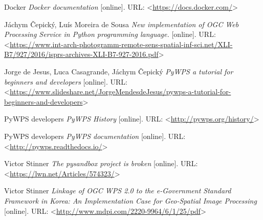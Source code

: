 \documentclass[12pt,a4paper]{article}
\begin{document}
\begin{thebibliography}{99}
Docker \textit{Docker documentation} [online].
URL: \textless\url{https://docs.docker.com/}\textgreater

Jáchym Čepický, Luís Moreira de Sousa \textit{New implementation of OGC Web Processing Service in Python programming language.} [online].
URL: \textless\url{https://www.int-arch-photogramm-remote-sens-spatial-inf-sci.net/XLI-B7/927/2016/isprs-archives-XLI-B7-927-2016.pdf}\textgreater

Jorge de Jesus, Luca Casagrande, Jáchym Čepický \textit{PyWPS a tutorial for beginners and developers} [online].
URL: \textless\url{https://www.slideshare.net/JorgeMendesdeJesus/pywps-a-tutorial-for-beginners-and-developers}\textgreater

PyWPS developers \textit{PyWPS History} [online].
URL: \textless\url{http://pywps.org/history/}\textgreater

PyWPS developers \textit{PyWPS documentation} [online].
URL: \textless\url{http://pywps.readthedocs.io/}\textgreater

Victor Stinner \textit{The pysandbox project is broken} [online].
URL: \textless\url{https://lwn.net/Articles/574323/}\textgreater

Victor Stinner \textit{Linkage of OGC WPS 2.0 to the e-Government Standard Framework in Korea: An Implementation Case for Geo-Spatial Image Processing} [online].
URL: \textless\url{http://www.mdpi.com/2220-9964/6/1/25/pdf}\textgreater
\end{thebibliography}


\end{document}
